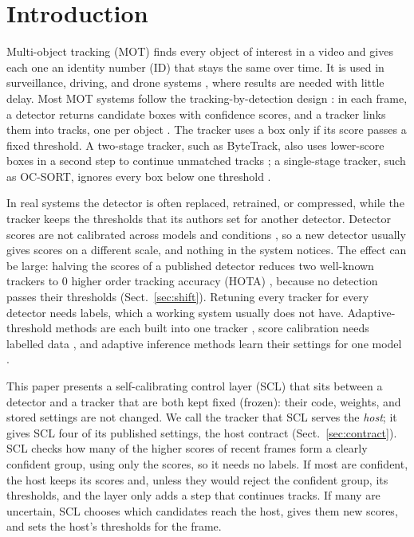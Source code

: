 \documentclass[pdflatex,sn-mathphys-num,iicol]{sn-jnl}
\newcommand{\scl}{SCL}
\begin{document}
\maketitle

\section{Introduction}\label{sec:intro}

Multi-object tracking (MOT) finds every object of interest in a video and gives each one an
identity number (ID) that stays the same over time. It is used in surveillance, driving, and drone
systems \cite{zhu2022visdrone,wu2022uavsurvey}, where results are needed with little delay. Most
MOT systems follow the tracking-by-detection design \cite{adzemovic2026survey}: in each frame, a
detector returns candidate boxes with confidence scores, and a tracker links them into tracks, one
per object \cite{bewley2016sort,zhang2022bytetrack,cao2023ocsort}. The tracker uses a box only if
its score passes a fixed threshold. A two-stage tracker, such as ByteTrack, also uses lower-score
boxes in a second step to continue unmatched tracks \cite{zhang2022bytetrack}; a single-stage
tracker, such as OC-SORT, ignores every box below one threshold \cite{cao2023ocsort}.

In real systems the detector is often replaced, retrained, or compressed, while the tracker keeps
the thresholds that its authors set for another detector. Detector scores are not calibrated across
models and conditions \cite{kuppers2020detcalib}, so a new detector usually gives scores on a
different scale, and nothing in the system notices. The effect can be large: halving the scores of
a published detector reduces two well-known trackers to 0 higher order tracking accuracy (HOTA)
\cite{luiten2021hota}, because no detection passes their thresholds (Sect.~\ref{sec:shift}).
Retuning every tracker for every detector needs labels, which a working system usually does not
have. Adaptive-threshold methods are each built into one tracker
\cite{ma2023adaptivebytetrack,shim2024adaptrack,act2026adaptive}, score calibration needs
labelled data \cite{kuppers2020detcalib}, and adaptive inference methods learn their settings for
one model \cite{han2022dynamic,jiang2018chameleon}.

This paper presents a self-calibrating control layer (\scl{}) that sits between a detector and a
tracker that are both kept fixed (frozen): their code, weights, and stored settings are not
changed. We call the tracker that \scl{} serves the \emph{host}; it gives \scl{} four of its
published settings, the host contract (Sect.~\ref{sec:contract}). \scl{} checks how many of the
higher scores of recent frames form a clearly confident group, using only the scores, so it needs
no labels. If most are confident, the host keeps its scores and, unless they would reject the
confident group, its thresholds, and the layer only adds a step that continues tracks. If many are uncertain, \scl{} chooses which candidates reach the host, gives
them new scores, and sets the host's thresholds for the frame.
\end{document}
